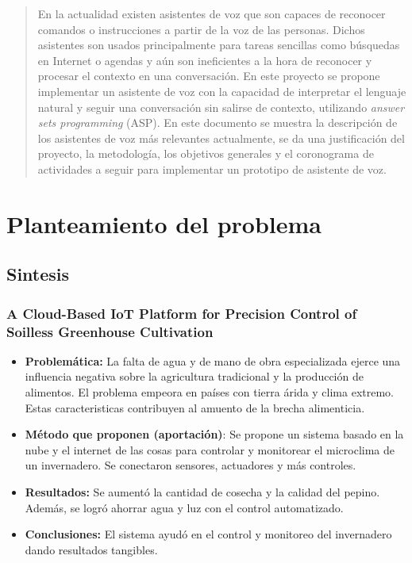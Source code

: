 \documentclass[final,12pt]{article}
\begin{document}
\clearpage

\tableofcontents
\clearpage
\listoffigures
\clearpage
\listoftables
\clearpage

\begin{abstract} \noindent
En la actualidad existen asistentes de voz que son capaces de reconocer comandos o instrucciones a partir de la voz de las personas. Dichos asistentes son usados principalmente para tareas sencillas como búsquedas en Internet o agendas y aún son ineficientes a la hora de reconocer y procesar el contexto en una conversación. En este proyecto se propone implementar un asistente de voz con la capacidad de interpretar el lenguaje natural y seguir una conversación sin salirse de contexto, utilizando \textit{answer sets programming} (ASP). En este documento se muestra la descripción de los asistentes de voz más relevantes actualmente, se da una justificación del proyecto, la metodología, los objetivos generales y el coronograma de actividades a seguir para implementar un prototipo de asistente de voz.
\end{abstract}
 



\section{Planteamiento del problema}

\subsection{Sintesis}
\subsubsection{A Cloud-Based IoT Platform for Precision Control of Soilless Greenhouse Cultivation}
\begin{itemize}
    \item \textbf{Problemática: }
    La falta de agua y de mano de obra especializada ejerce una influencia negativa sobre la agricultura tradicional y la producción de alimentos. El problema empeora en países con tierra árida y clima extremo. Estas caracteristicas contribuyen al amuento de la brecha alimenticia.
    \item \textbf{Método que proponen (aportación)}: Se propone un sistema basado en la nube y el internet de las cosas para controlar y monitorear el microclima de un invernadero. Se conectaron sensores, actuadores y más controles.
    \item \textbf{Resultados: } Se aumentó la cantidad de cosecha y la calidad del pepino. Además, se logró ahorrar agua y luz con el control automatizado.
    \item \textbf{Conclusiones: } El sistema ayudó en el control y monitoreo del invernadero dando resultados tangibles.
\end{itemize}
\end{document}
